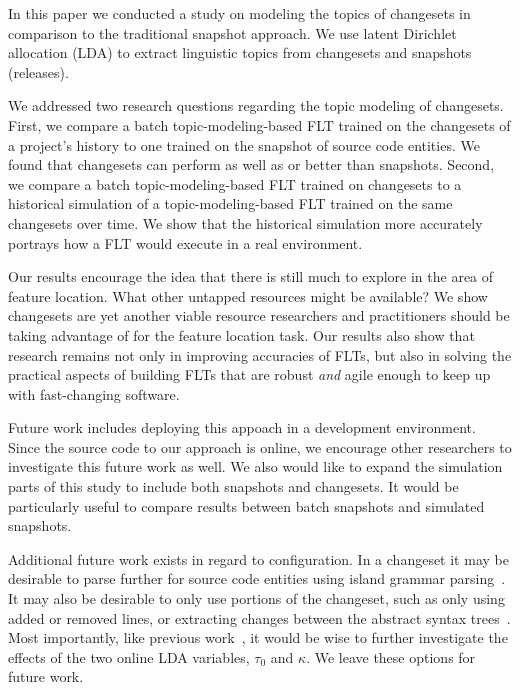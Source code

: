 
In this paper we conducted a study on modeling the topics of changesets in
comparison to the traditional snapshot approach.  We use latent Dirichlet
allocation (LDA) to extract linguistic topics from changesets and snapshots
(releases).

We addressed two research questions regarding the topic modeling of changesets.
First, we compare a batch topic-modeling-based FLT trained on the changesets of
a project's history to one trained on the snapshot of source code entities.  We
found that changesets can perform as well as or better than snapshots.  Second,
we compare a batch topic-modeling-based FLT trained on changesets to a
historical simulation of a
topic-modeling-based FLT trained on the same changesets over time.  We show that
the historical simulation more accurately portrays how a FLT would execute in a real
environment.

Our results encourage the idea that there is still much to explore in the area
of feature location. What other untapped resources might be available? We show
changesets are yet another viable resource researchers and practitioners should
be taking advantage of for the feature location task.  Our results also show
that research remains not only in improving accuracies of FLTs, but also in
solving the practical aspects of building FLTs that are robust \emph{and} agile
enough to keep up with fast-changing software.

Future work includes deploying this appoach in a development environment.  Since
the source code to our approach is online, we encourage other researchers to
investigate this future work as well.  We also would like to expand the simulation 
parts of this study to include both snapshots and changesets.  It would be
particularly useful to compare results between batch snapshots and simulated
snapshots. 

Additional future work exists in regard to configuration. In a changeset
it may be desirable to parse further for source code entities using
island grammar parsing~\cite{Moonen:2001}.  It may also be desirable to
only use portions of the changeset, such as only using added or removed
lines, or extracting changes between the abstract syntax
trees~\cite{Fluri-etal:2007}. Most importantly, like previous
work~\cite{Biggers-etal:2014}, it would be wise to further investigate
the effects of the two online LDA variables, $\tau_0$ and $\kappa$.  We
leave these options for future work.

